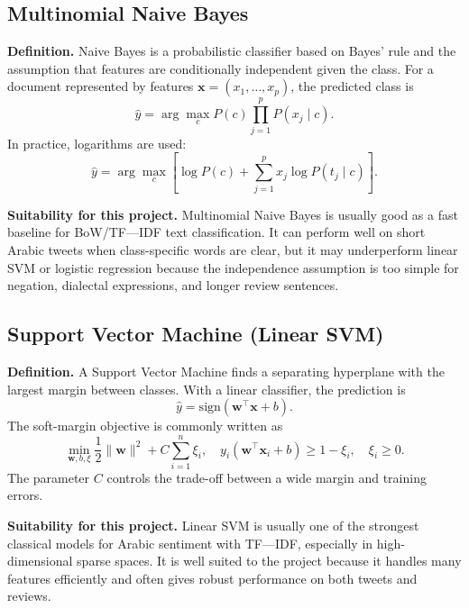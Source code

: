 \documentclass[11pt,a4paper]{report}
\begin{document}
\subsection{Multinomial Naive Bayes}

\textbf{Definition.} Naive Bayes is a probabilistic classifier based on Bayes' rule and the assumption that features are conditionally independent given the class. For a document represented by features $\mathbf{x} = (x_1,\ldots,x_p)$, the predicted class is
\begin{equation}
    \hat{y}
    =
    \arg\max_{c}
    P(c)\prod_{j=1}^{p} P(x_j \mid c).
\end{equation}
In practice, logarithms are used:
\begin{equation}
    \hat{y}
    =
    \arg\max_{c}
    \left[
    \log P(c) + \sum_{j=1}^{p} x_j \log P(t_j \mid c)
    \right].
\end{equation}

\textbf{Suitability for this project.} Multinomial Naive Bayes is usually good as a fast baseline for BoW/TF---IDF text classification. It can perform well on short Arabic tweets when class-specific words are clear, but it may underperform linear SVM or logistic regression because the independence assumption is too simple for negation, dialectal expressions, and longer review sentences.

\subsection{Support Vector Machine (Linear SVM)}

\textbf{Definition.} A Support Vector Machine finds a separating hyperplane with the largest margin between classes. With a linear classifier, the prediction is
\begin{equation}
    \hat{y} = \mathrm{sign}(\mathbf{w}^{\top}\mathbf{x} + b).
\end{equation}
The soft-margin objective is commonly written as
\begin{equation}
    \min_{\mathbf{w},b,\xi}
    \frac{1}{2}\|\mathbf{w}\|^2
    + C\sum_{i=1}^{n}\xi_i,
    \quad
    y_i(\mathbf{w}^{\top}\mathbf{x}_i+b) \geq 1-\xi_i,
    \quad
    \xi_i \geq 0.
\end{equation}
The parameter $C$ controls the trade-off between a wide margin and training errors.

\textbf{Suitability for this project.} Linear SVM is usually one of the strongest classical models for Arabic sentiment with TF---IDF, especially in high-dimensional sparse spaces. It is well suited to the project because it handles many features efficiently and often gives robust performance on both tweets and reviews.
\end{document}
